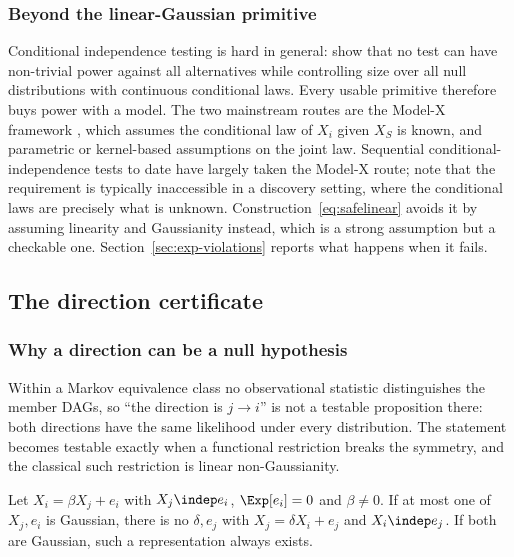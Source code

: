 \subsubsection{Beyond the linear-Gaussian primitive}\label{sec:beyondlg}

Conditional independence testing is hard in general: \citet{shah2020hardness}
show that no test can have non-trivial power against all alternatives while
controlling size over all null distributions with continuous conditional
laws. Every usable primitive therefore buys power with a model. The two
mainstream routes are the Model-X framework
\citep{candes2018panning}, which assumes the conditional law of $X_i$ given
$X_S$ is known, and parametric or kernel-based assumptions on the joint law.
Sequential conditional-independence tests to date have largely taken the
Model-X route; \citet{csillag2025prediction} note that the requirement is
typically inaccessible in a discovery setting, where the conditional laws are
precisely what is unknown. Construction~\eqref{eq:safelinear} avoids it by
assuming linearity and Gaussianity instead, which is a strong assumption but a
checkable one. Section~\ref{sec:exp-violations} reports what happens when it
fails.

\subsection{The direction certificate}\label{sec:direction}

\subsubsection{Why a direction can be a null hypothesis}\label{sec:whynull}

Within a Markov equivalence class no observational statistic distinguishes the
member DAGs, so ``the direction is $j \to i$'' is not a testable proposition
there: both directions have the same likelihood under every distribution. The
statement becomes testable exactly when a functional restriction breaks the
symmetry, and the classical such restriction is linear non-Gaussianity.

\begin{proposition}
\label{prop:lingam}
Let $X_i = \beta X_j + e_i$ with $X_j \indep e_i$, $\Exp[e_i] = 0$ and
$\beta \neq 0$. If at most one of $X_j, e_i$ is Gaussian, there is no
$\delta, e_j$ with $X_j = \delta X_i + e_j$ and $X_i \indep e_j$. If both are
Gaussian, such a representation always exists.
\end{proposition}

